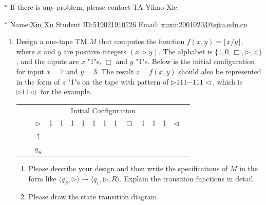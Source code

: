\documentclass[12pt,a4paper]{article}
\theoremstyle{definition}
\begin{document}
\noindent

\noindent{}
\begin{center}
\footnotesize{\color{red}$*$ If there is any problem, please contact TA Yihao Xie. }

\footnotesize{\color{blue}$*$ Name:\underline{Xin Xu}  \quad Student ID:\underline{519021910726} \quad Email: \underline{xuxin20010203@sjtu.edu.cn}}
\end{center}

\begin{enumerate}
    \item Design a one-tape TM $M$ that computes the function $f(x, y) = \lfloor x/y \rfloor$, where $x$ and $y$ are positive integers $(x > y)$. The alphabet is $\{1, 0, \Box, \triangleright, \triangleleft\}$, and the inputs are $x$ "1"s, $\Box$ and $y$ "1"s. Below is the initial configuration for input $x=7$ and $y=3$. The result $z=f(x,y)$ should also be represented in the form of $z$ "1"s on the tape with pattern of $\rhd 111\cdots 111\lhd$, which is $\rhd 11\lhd$ for the example.
    
	\begin{center}
		\begin{tabular}{ll|c|c|c|c|c|c|c|c|c|c|c|c|c|c}
			& \multicolumn{14}{c}{Initial Configuration}\\[5pt]
			\cline{2-16}
			& & $\triangleright$ &  1  & 1 & 1 & 1 & 1 & 1 & 1 & $\Box$ & 1 & 1 & 1 & $ \triangleleft$ & \\
			\cline{2-16}
			\multicolumn{2}{c}{} & \multicolumn{1}{c}{$\uparrow$} & \multicolumn{11}{c}{}\\
			\multicolumn{2}{c}{} & \multicolumn{1}{c}{$q_S$} & \multicolumn{11}{c}{}	
		\end{tabular}
	\end{center}

    \begin{enumerate}
	\item
	Please describe your design and then write the specifications of $M$ in the form like $\langle q_S, \triangleright \rangle \rightarrow \langle q_1, \triangleright,  R\rangle$. Explain the transition functions in detail.
	
	\item
	Please draw the state transition diagram.
	

\end{enumerate}
\end{enumerate}
\end{document}
